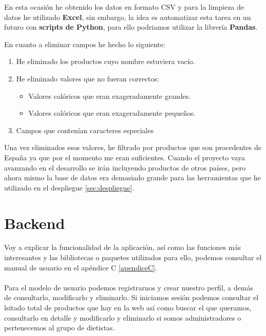 En esta ocasión he obtenido los datos en formato CSV y para la limpieza de datos he utilizado \textbf{Excel}, sin embargo, la idea es automatizar esta tarea en un futuro
con \textbf{scripts de Python}, para ello podriamos utilizar la librería \textbf{Pandas}.

En cuanto a eliminar campos he hecho lo siguiente:
\begin{enumerate}
  \item He eliminado los productos cuyo nombre estuviera vacío.
  \item He eliminado valores que no fueran correctos:
  \begin{itemize}
    \item Valores calóricos que eran exageradamente grandes.
    \item Valores calóricos que eran exageradamente pequeños.
  \end{itemize}
  \item Campos que contenían caracteres especiales
\end{enumerate}

Una vez eliminados esos valores, he filtrado por productos que son procedentes de España ya que por el momento me eran suficientes.
Cuando el proyecto vaya avanzando en el desarrollo se irán incluyendo productos de otros países, pero ahora mismo la base de datos era
 demasiado grande para las herramientas que he utilizado en el despliegue \ref{sec:despliegue}.\\

\section{Backend} \label{sec:backend}

Voy a explicar la funcionalidad de la aplicación, así como las funciones más interesantes y las bibliotecas o paquetes utilizados para ello, podemos consultar el manual de usuario en el apéndice C \ref*{apendiceC}. \\ \\

Para el modelo de usuario podemos registrarnos y crear nuestro perfil, a demás de consultarlo, modificarlo y eliminarlo.
Si iniciamos sesión podemos consultar el lsitado total de productos que hay en la web así como buscar el que queramos, consultarlo en detalle y
modificarlo y eliminarlo si somos administradores o pertenecemos al grupo de dietistas.\\ \\

